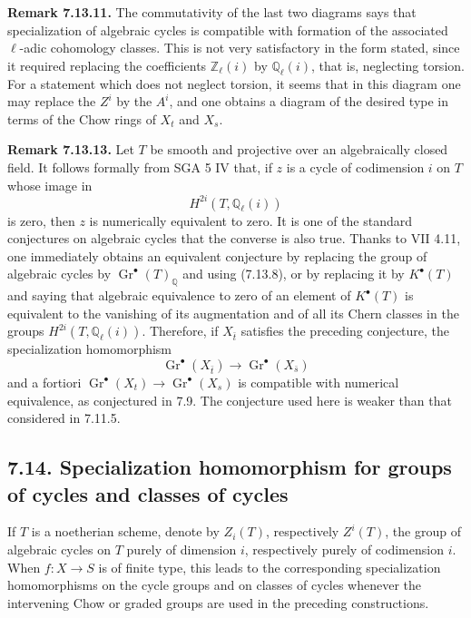 \documentclass[11pt]{article}
\newcommand{\Gr}{\operatorname{Gr}}
\providecommand{\Gr}{\operatorname{Gr}}
\providecommand{\Gr}{\operatorname{G}}
\begin{document}
\textbf{Remark 7.13.11.} The commutativity of the last two diagrams says that specialization of algebraic cycles is compatible with formation of the associated \(\ell\)-adic cohomology classes. This is not very satisfactory in the form stated, since it required replacing the coefficients \(\mathbb Z_\ell(i)\) by \(\mathbb Q_\ell(i)\), that is, neglecting torsion. For a statement which does not neglect torsion, it seems that in this diagram one may replace the \(Z^i\) by the \(A^i\), and one obtains a diagram of the desired type in terms of the Chow rings of \(X_t\) and \(X_s\).

\textbf{Remark 7.13.13.} Let \(T\) be smooth and projective over an algebraically closed field. It follows formally from SGA 5 IV that, if \(z\) is a cycle of codimension \(i\) on \(T\) whose image in
\[
  H^{2i}(T,\mathbb Q_\ell(i))
\]
is zero, then \(z\) is numerically equivalent to zero. It is one of the standard conjectures on algebraic cycles that the converse is also true. Thanks to VII 4.11, one immediately obtains an equivalent conjecture by replacing the group of algebraic cycles by \(\Gr^\bullet(T)_{\mathbb Q}\) and using (7.13.8), or by replacing it by \(K^\bullet(T)\) and saying that algebraic equivalence to zero of an element of \(K^\bullet(T)\) is equivalent to the vanishing of its augmentation and of all its Chern classes in the groups \(H^{2i}(T,\mathbb Q_\ell(i))\). Therefore, if \(X_{\bar t}\) satisfies the preceding conjecture, the specialization homomorphism
\[
  \Gr^\bullet(X_{\bar t})\longrightarrow\Gr^\bullet(X_{\bar s})
\]
and a fortiori \(\Gr^\bullet(X_t)\to\Gr^\bullet(X_s)\) is compatible with numerical equivalence, as conjectured in 7.9. The conjecture used here is weaker than that considered in 7.11.5.

\subsection*{7.14. Specialization homomorphism for groups of cycles and classes of cycles}
If \(T\) is a noetherian scheme, denote by \(Z_i(T)\), respectively \(Z^i(T)\), the group of algebraic cycles on \(T\) purely of dimension \(i\), respectively purely of codimension \(i\). When \(f:X\to S\) is of finite type, this leads to the corresponding specialization homomorphisms on the cycle groups and on classes of cycles whenever the intervening Chow or graded groups are used in the preceding constructions.
\end{document}
